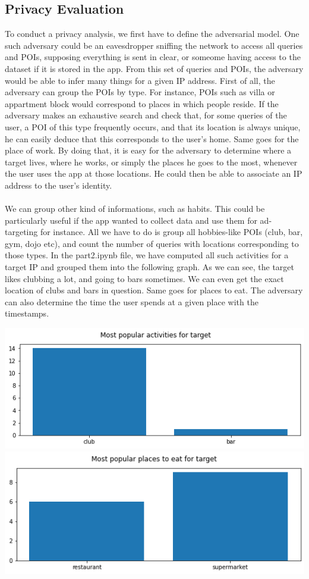 \documentclass[10pt,conference,compsocconf]{IEEEtran}
\begin{document}
\subsection{Privacy Evaluation} 
	To conduct a privacy analysis, we first have to define the adversarial model. One such adversary could be an eavesdropper sniffing the network to access all queries and POIs, supposing everything is sent in clear, or someome having access to the dataset if it is stored in the app. From this set of queries and POIs, the adversary would be able to infer many things for a given IP address. First of all, the adversary can group the POIs by type. For instance, POIs such as villa or appartment block would correspond to places in which people reside. If the adversary makes an exhaustive search and check that, for some queries of the user, a POI of this type frequently occurs, and that its location is always unique, he can easily deduce that this corresponds to the user's home. Same goes for the place of work. By doing that, it is easy for the adversary to determine where a target lives, where he works, or simply the places he goes to the most, whenever the user uses the app at those locations. He could then be able to associate an IP address to the user's identity.
\\	
\hspace{1cm}
\\
	We can group other kind of informations, such as habits. This could be particularly useful if the app wanted to collect data and use them for ad-targeting for instance. All we have to do is group all hobbies-like POIs (club, bar, gym, dojo etc), and count the number of queries with locations corresponding to those types. In the part2.ipynb file, we have computed all such activities for a target IP and grouped them into the following graph. As we can see, the target likes clubbing a lot, and going to bars sometimes. We can even get the exact location of clubs and bars in question.
Same goes for places to eat. The adversary can also determine the time the user spends at a given place with the timestamps. 
	
\includegraphics[scale=0.45]{target_activities}
\includegraphics[scale=0.45]{target_places_to_eat}
	 
\end{document}
